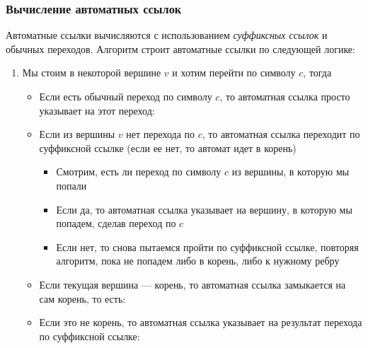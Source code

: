 \documentclass[a4paper]{article}
\begin{document}
\subsubsection{Вычисление автоматных ссылок}
Автоматные ссылки вычисляются с использованием \textit{суффиксных ссылок} и обычных переходов. Алгоритм строит автоматные ссылки по следующей логике:
\begin{enumerate}
    \item Мы стоим в некоторой вершине $v$ и хотим перейти по символу $c$, тогда
    \begin{itemize}
        \item Если есть обычный переход по символу $c$, то автоматная ссылка просто указывает на этот переход: 
        \item Если из вершины $v$ нет перехода по $c$, то автоматная ссылка переходит по суффиксной ссылке (если ее нет, то автомат идет в корень)
        \begin{itemize}
            \item Смотрим, есть ли переход по символу $c$ из вершины, в которую мы попали
            \item Если да, то автоматная ссылка указывает на вершину, в которую мы попадем, сделав переход по $c$
            \item Если нет, то снова пытаемся пройти по суффиксной ссылке, повторяя алгоритм, пока не попадем либо в корень, либо к нужному ребру
        \end{itemize}
    \end{itemize}
    \begin{itemize}
        \item Если текущая вершина — корень, то автоматная ссылка замыкается на сам корень, то есть: 
        \item Если это не корень, то автоматная ссылка указывает на результат перехода по суффиксной ссылке: 
     
    \end{itemize}
\end{enumerate}
\end{document}
